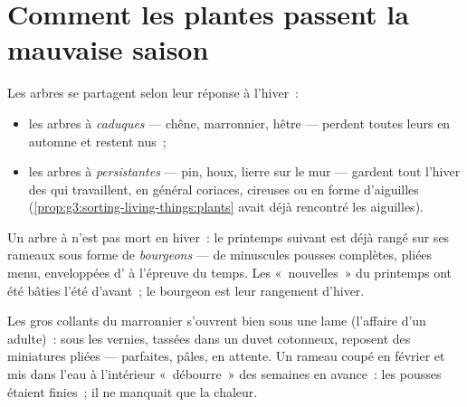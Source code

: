 \section{Comment les plantes passent la mauvaise saison}

\begin{definition}\label{def:g6:life-through-seasons:trees}
Les arbres se partagent selon leur réponse à l'hiver~:
\begin{itemize}
  \item les arbres à  \emph{caduques} ---
        chêne, marronnier, hêtre --- perdent toutes leurs 
        en automne et restent nus~;
  \item les arbres à  \emph{persistantes}
        --- pin, houx, lierre sur le mur --- gardent tout l'hiver
        des  qui travaillent, en général coriaces, cireuses
        ou en forme d'aiguilles
        (\cref{prop:g3:sorting-living-things:plants} avait déjà
        rencontré les aiguilles).
\end{itemize}
\end{definition}

\begin{definition}[Bourgeons]\label{def:g6:life-through-seasons:buds}
Un arbre à   n'est pas mort en hiver~: le printemps
suivant est déjà rangé sur ses rameaux sous forme de
\emph{bourgeons} --- de minuscules pousses
complètes,  pliées menu, enveloppées d' à l'épreuve
du temps. Les  «~nouvelles~» du printemps ont été bâties
l'été d'avant~; le bourgeon est leur rangement d'hiver.
\end{definition}

\begin{example}\label{ex:g6:life-through-seasons:bud}
Les gros  collants du marronnier s'ouvrent bien sous une
lame (l'affaire d'un adulte)~: sous les  vernies, tassées
dans un duvet cotonneux, reposent des  miniatures pliées ---
parfaites, pâles, en attente. Un rameau coupé en février et mis dans
l'eau à l'intérieur «~débourre~» des semaines en avance~: les pousses
étaient finies~; il ne manquait que la chaleur.
\end{example}

